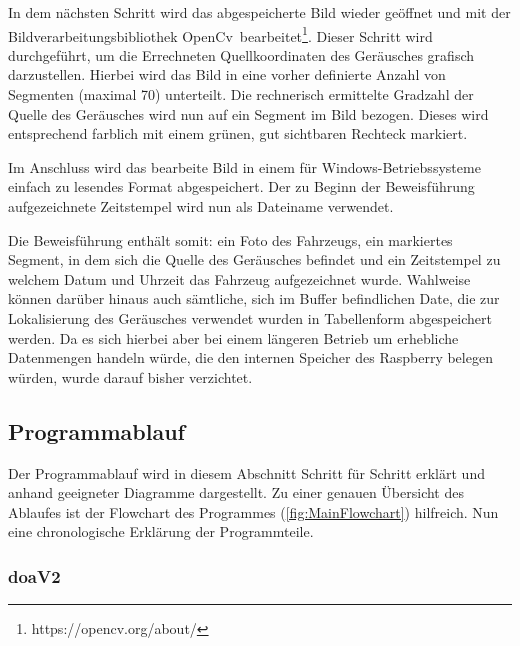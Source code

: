 In dem nächsten Schritt wird das abgespeicherte Bild wieder geöffnet und mit der Bildverarbeitungsbibliothek \glqq OpenCv\grqq\ bearbeitet\footnote{https://opencv.org/about/}. Dieser Schritt wird durchgeführt, um die Errechneten Quellkoordinaten des Geräusches grafisch darzustellen. Hierbei wird das Bild in eine vorher definierte Anzahl von Segmenten (maximal 70) unterteilt. Die rechnerisch ermittelte Gradzahl der Quelle des Geräusches wird nun auf ein Segment im Bild bezogen. Dieses wird entsprechend farblich mit einem grünen, gut sichtbaren Rechteck markiert.

Im Anschluss wird das bearbeite Bild in einem für Windows-Betriebssysteme einfach zu lesendes Format abgespeichert. Der zu Beginn der Beweisführung aufgezeichnete Zeitstempel wird nun als Dateiname verwendet.

Die Beweisführung enthält somit: ein Foto des Fahrzeugs, ein markiertes Segment, in dem sich die Quelle des Geräusches befindet und ein Zeitstempel zu welchem Datum und Uhrzeit das Fahrzeug aufgezeichnet wurde. Wahlweise können darüber hinaus auch sämtliche, sich im Buffer befindlichen Date, die zur Lokalisierung des Geräusches verwendet wurden in Tabellenform abgespeichert werden. Da es sich hierbei aber bei einem längeren Betrieb um erhebliche Datenmengen handeln würde, die den internen Speicher des Raspberry belegen würden, wurde darauf bisher verzichtet. 

\subsection{Programmablauf}

Der Programmablauf wird in diesem Abschnitt Schritt für Schritt erklärt und anhand geeigneter Diagramme dargestellt. Zu einer genauen Übersicht des Ablaufes ist der Flowchart des Programmes (\autoref{fig:MainFlowchart}) hilfreich. Nun eine chronologische Erklärung der Programmteile.



\subsubsection{doaV2}

